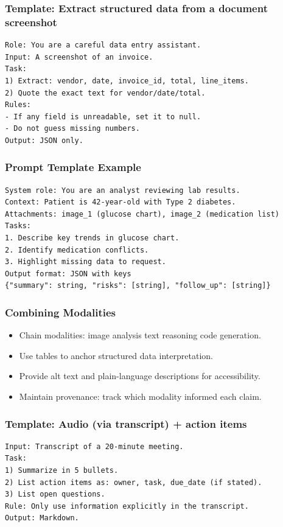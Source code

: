 \documentclass{beamer}
\begin{document}
\begin{frame}[fragile]
    \frametitle{Template: Extract structured data from a document screenshot}
\begin{verbatim}
Role: You are a careful data entry assistant.
Input: A screenshot of an invoice.
Task:
1) Extract: vendor, date, invoice_id, total, line_items.
2) Quote the exact text for vendor/date/total.
Rules:
- If any field is unreadable, set it to null.
- Do not guess missing numbers.
Output: JSON only.
\end{verbatim}
\end{frame}

\begin{frame}[fragile]
    \frametitle{Prompt Template Example}
\begin{verbatim}
System role: You are an analyst reviewing lab results.
Context: Patient is 42-year-old with Type 2 diabetes.
Attachments: image_1 (glucose chart), image_2 (medication list)
Tasks:
1. Describe key trends in glucose chart.
2. Identify medication conflicts.
3. Highlight missing data to request.
Output format: JSON with keys
{"summary": string, "risks": [string], "follow_up": [string]}
\end{verbatim}
\end{frame}

\begin{frame}
    \frametitle{Combining Modalities}
    \begin{itemize}
        \item Chain modalities: image analysis \textrightarrow{} text reasoning \textrightarrow{} code generation.
        \item Use tables to anchor structured data interpretation.
        \item Provide alt text and plain-language descriptions for accessibility.
        \item Maintain provenance: track which modality informed each claim.
    \end{itemize}
\end{frame}

\begin{frame}[fragile]
    \frametitle{Template: Audio (via transcript) + action items}
\begin{verbatim}
Input: Transcript of a 20-minute meeting.
Task:
1) Summarize in 5 bullets.
2) List action items as: owner, task, due_date (if stated).
3) List open questions.
Rule: Only use information explicitly in the transcript.
Output: Markdown.
\end{verbatim}
\end{frame}
\end{document}
